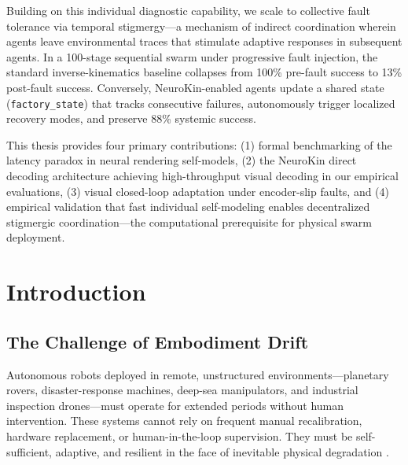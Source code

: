 \documentclass[12pt,a4paper,oneside]{report}
\begin{document}
Building on this individual diagnostic capability, we scale to collective fault tolerance via temporal stigmergy—a mechanism of indirect coordination wherein agents leave environmental traces that stimulate adaptive responses in subsequent agents. In a 100-stage sequential swarm under progressive fault injection, the standard inverse-kinematics baseline collapses from 100\% pre-fault success to 13\% post-fault success. Conversely, NeuroKin-enabled agents update a shared state (\texttt{factory\_state}) that tracks consecutive failures, autonomously trigger localized recovery modes, and preserve 88\% systemic success.

This thesis provides four primary contributions: (1) formal benchmarking of the latency paradox in neural rendering self-models, (2) the NeuroKin direct decoding architecture achieving high-throughput visual decoding in our empirical evaluations, (3) visual closed-loop adaptation under encoder-slip faults, and (4) empirical validation that fast individual self-modeling enables decentralized stigmergic coordination—the computational prerequisite for physical swarm deployment.

\clearpage

\tableofcontents
\clearpage
\listoffigures
{}
\clearpage
\listoftables
{}
\clearpage


\chapter{Introduction}
\label{chap:intro}

\section{The Challenge of Embodiment Drift}
\label{sec:challenge_embodiment_drift}

Autonomous robots deployed in remote, unstructured environments—planetary rovers, disaster-response machines, deep-sea manipulators, and industrial inspection drones—must operate for extended periods without human intervention. These systems cannot rely on frequent manual recalibration, hardware replacement, or human-in-the-loop supervision. They must be self-sufficient, adaptive, and resilient in the face of inevitable physical degradation \cite{bongard2006resilient, cully2015robots}.
\end{document}
